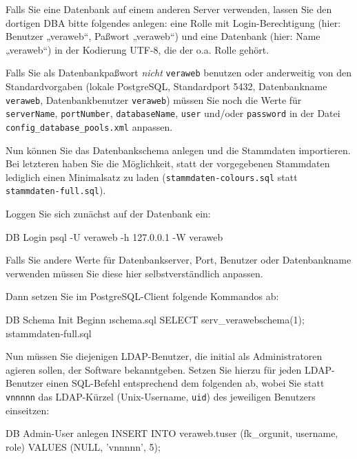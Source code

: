 Falls Sie eine Datenbank auf einem anderen Server verwenden, lassen
Sie den dortigen DBA bitte folgendes anlegen: eine Rolle mit
Login-Berechtigung (hier: Benutzer „veraweb“, Paßwort „veraweb“)
und eine Datenbank (hier: Name „veraweb“) in der Kodierung UTF-8,
die der o.a. Rolle gehört.

Falls Sie als Datenbankpaßwort \emph{nicht} \texttt{veraweb} benutzen oder
anderweitig von den Standardvorgaben (lokale PostgreSQL, Standardport 5432,
Datenbankname \texttt{veraweb}, Datenbankbenutzer \texttt{veraweb}) müssen
Sie noch die Werte für \texttt{serverName}, \texttt{portNumber},
\texttt{databaseName}, \texttt{user} und/oder \texttt{password} in der
Datei \texttt{config\_database\_pools.xml} anpassen.

Nun können Sie das Datenbankschema anlegen und die Stammdaten importieren.
Bei letzteren haben Sie die Möglichkeit, statt der vorgegebenen Stammdaten
lediglich einen Minimalsatz zu laden (\texttt{stammdaten-colours.sql} statt
\texttt{stammdaten-full.sql}).

\begin{minipage}{\textwidth}
Loggen Sie sich zunächst auf der Datenbank ein:

\begin{lstdump}{DB Login}
psql -U veraweb -h 127.0.0.1 -W veraweb
\end{lstdump}
\end{minipage}

Falls Sie andere Werte für Datenbankserver, Port, Benutzer oder Datenbankname
verwenden müssen Sie diese hier selbstverständlich anpassen.

\begin{minipage}{\textwidth}
Dann setzen Sie im PostgreSQL-Client folgende Kommandos ab:

\begin{lstdump}{DB Schema Init Beginn}
\i schema.sql
SELECT serv_verawebschema(1);
\i stammdaten-full.sql
\end{lstdump}
\end{minipage}

\begin{minipage}{\textwidth}
Nun müssen Sie diejenigen LDAP-Benutzer, die initial als Administratoren
agieren sollen, der Software bekanntgeben. Setzen Sie hierzu für jeden
LDAP-Benutzer einen SQL-Befehl entsprechend dem folgenden ab, wobei Sie
statt \texttt{vnnnnn} das LDAP-Kürzel (Unix-Username, \texttt{uid}) des
jeweiligen Benutzers einseitzen:

\begin{lstdump}[language=SQL]{DB Admin-User anlegen}
INSERT INTO veraweb.tuser (fk_orgunit, username, role)
    VALUES (NULL, 'vnnnnn', 5);
\end{lstdump}\label{manual:db-user}
\end{minipage}

